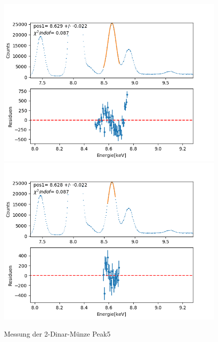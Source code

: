 \documentclass[12pt,a4paper]{article}
\begin{document}
\begin{figure}[H]
\centering
\includegraphics[scale=0.49]{Bilder/roentgen_spektren/denar/den5_1.png}
\includegraphics[scale=0.49]{Bilder/roentgen_spektren/denar/den5_2.png}
\caption{Messung der 2-Dinar-Münze Peak5}
\end{figure}
\end{document}
